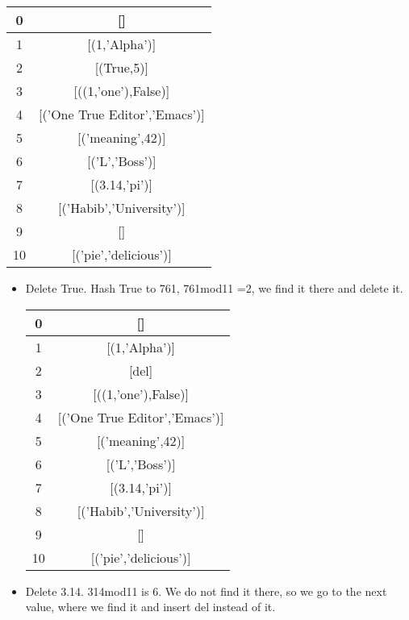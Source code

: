 \documentclass{article}
\begin{document}
\begin{enumerate}
\begin{center}
\begin{tabular}{ |c|c| }
					\hline
					0 & []   \\ 
					\hline
					1 &	[(1,'Alpha')] \\
					\hline 
					2 & [(True,5)]  \\ 
					\hline
					3&[((1,'one'),False)]\\
					\hline
					4&[('One True Editor','Emacs')]\\
					\hline
					5&[('meaning',42)]\\
					\hline
					6&[('L','Boss')]\\
					\hline
					7&[(3.14,'pi')]\\
					\hline
					8&[('Habib','University')]\\
					\hline
					9&[]\\
					\hline
					10&[('pie','delicious')]\\
					\hline
				\end{tabular}
			\end{center}
	\begin{itemize}
		\item Delete True. Hash True to 761, 761mod11 =2, we find it there and delete it.
				\begin{center}
					\begin{tabular}{ |c|c| } 
						\hline
						0 & []   \\ 
						\hline
						1 &	[(1,'Alpha')] \\
						\hline 
						2 & [del]  \\ 
						\hline
						3&[((1,'one'),False)]\\
						\hline
						4&[('One True Editor','Emacs')]\\
						\hline
						5&[('meaning',42)]\\
						\hline
						6&[('L','Boss')]\\
						\hline
						7&[(3.14,'pi')]\\
						\hline
						8&[('Habib','University')]\\
						\hline
						9&[]\\
						\hline
						10&[('pie','delicious')]\\
						\hline
					\end{tabular}
				\end{center}
			\item Delete 3.14. 314mod11 is 6. We do not find it there, so we go to the next value, where we find it and insert del instead of it.
					\begin{center}
						\begin{tabular}{ |c|c| } 

\end{tabular}
\end{center}
\end{itemize}
\end{enumerate}
\end{document}
